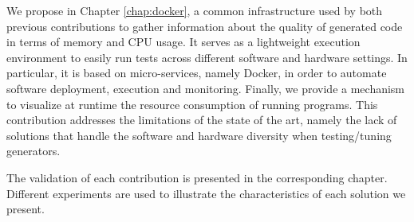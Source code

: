 \begin{itemize}
	We propose in Chapter \ref{chap:docker}, a common infrastructure used by both previous contributions to gather information about the quality of generated code in terms of memory and CPU usage. It serves as a lightweight execution environment to easily run tests across different software and hardware settings. In particular, it is based on micro-services, namely Docker, in order to automate software deployment, execution and monitoring. Finally, we provide a mechanism to visualize at runtime the resource consumption of running programs. This contribution addresses the limitations of the state of the art, namely the lack of solutions that handle the software and hardware diversity when testing/tuning generators.
\end{itemize}

The validation of each contribution is presented in the corresponding chapter. Different experiments are used to illustrate the characteristics of each solution we present.



